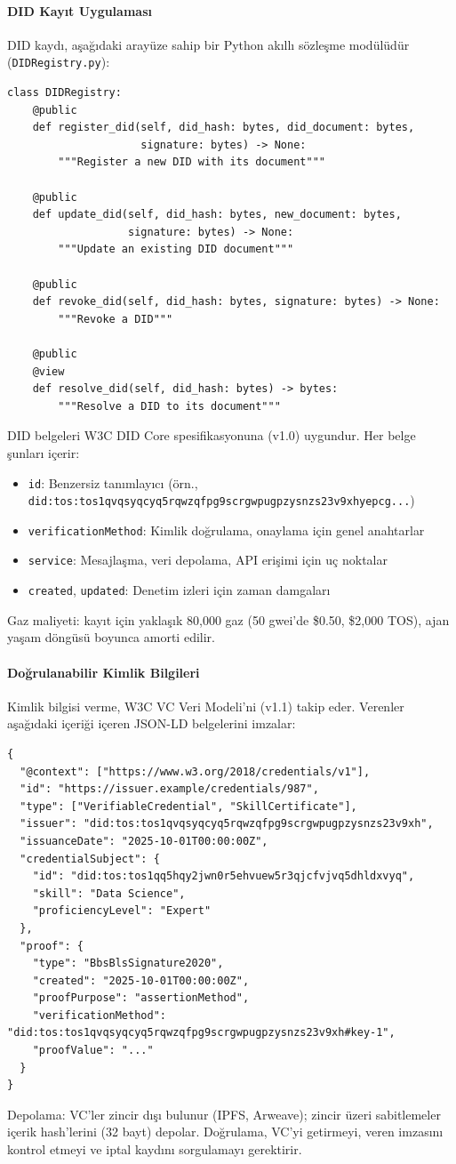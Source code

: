 \documentclass[11pt]{article}
\begin{document}
\paragraph{DID Kayıt Uygulaması} DID kaydı, aşağıdaki arayüze sahip bir Python akıllı sözleşme modülüdür (\texttt{DIDRegistry.py}):
\begin{verbatim}
class DIDRegistry:
    @public
    def register_did(self, did_hash: bytes, did_document: bytes,
                     signature: bytes) -> None:
        """Register a new DID with its document"""

    @public
    def update_did(self, did_hash: bytes, new_document: bytes,
                   signature: bytes) -> None:
        """Update an existing DID document"""

    @public
    def revoke_did(self, did_hash: bytes, signature: bytes) -> None:
        """Revoke a DID"""

    @public
    @view
    def resolve_did(self, did_hash: bytes) -> bytes:
        """Resolve a DID to its document"""
\end{verbatim}
DID belgeleri W3C DID Core spesifikasyonuna (v1.0) uygundur. Her belge şunları içerir:
\begin{itemize}[noitemsep]
  \item \texttt{id}: Benzersiz tanımlayıcı (örn., \texttt{did:tos:tos1qvqsyqcyq5rqwzqfpg9scrgwpugpzysnzs23v9xhyepcg...})
  \item \texttt{verificationMethod}: Kimlik doğrulama, onaylama için genel anahtarlar
  \item \texttt{service}: Mesajlaşma, veri depolama, API erişimi için uç noktalar
  \item \texttt{created}, \texttt{updated}: Denetim izleri için zaman damgaları
\end{itemize}
Gaz maliyeti: kayıt için yaklaşık 80,000 gaz (50 gwei'de \$0.50, \$2,000 TOS), ajan yaşam döngüsü boyunca amorti edilir.

\paragraph{Doğrulanabilir Kimlik Bilgileri} Kimlik bilgisi verme, W3C VC Veri Modeli'ni (v1.1) takip eder. Verenler aşağıdaki içeriği içeren JSON-LD belgelerini imzalar:
\begin{verbatim}
{
  "@context": ["https://www.w3.org/2018/credentials/v1"],
  "id": "https://issuer.example/credentials/987",
  "type": ["VerifiableCredential", "SkillCertificate"],
  "issuer": "did:tos:tos1qvqsyqcyq5rqwzqfpg9scrgwpugpzysnzs23v9xh",
  "issuanceDate": "2025-10-01T00:00:00Z",
  "credentialSubject": {
    "id": "did:tos:tos1qq5hqy2jwn0r5ehvuew5r3qjcfvjvq5dhldxvyq",
    "skill": "Data Science",
    "proficiencyLevel": "Expert"
  },
  "proof": {
    "type": "BbsBlsSignature2020",
    "created": "2025-10-01T00:00:00Z",
    "proofPurpose": "assertionMethod",
    "verificationMethod": "did:tos:tos1qvqsyqcyq5rqwzqfpg9scrgwpugpzysnzs23v9xh#key-1",
    "proofValue": "..."
  }
}
\end{verbatim}
Depolama: VC'ler zincir dışı bulunur (IPFS, Arweave); zincir üzeri sabitlemeler içerik hash'lerini (32 bayt) depolar. Doğrulama, VC'yi getirmeyi, veren imzasını kontrol etmeyi ve iptal kaydını sorgulamayı gerektirir.
\end{document}
